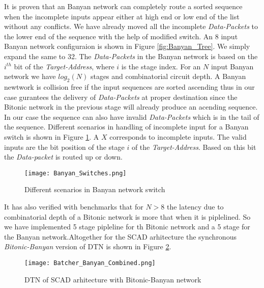 					      It is proven \cite{batcher_banyan_ref} that 
					      an Banyan network can completely route a sorted sequence when the incomplete inputs appear either at high end or low end of the list without any conflicts. We have already moved all the incomplete \textit{Data-Packets}
					      to the lower end of the sequence with the help of modified switch. An 8 input Banyan network configuraion is shown in Figure \ref{fig:Banyan_Tree}. We simply expand the same to 32.
					      The \textit{Data-Packets} in the Banyan network is based on the $i^{th}$ bit of the \textit{Target-Address}, where $i$ is the stage index. For an $N$ input Banyan network we have $log_{2}(N)$ 
					      stages and combinatorial circuit depth. A Banyan newtwork is collision free if the input sequences are sorted ascending
					      thus in our case gurantees the delivery of \textit{Data-Packets} at proper destination since the Bitonic network in the previous stage will already produce an acending sequence. In our case 
					      the sequence can also have invalid \textit{Data-Packets} which is in the tail of the sequence. Different scenarios in handling of incomplete input for a Banyan switch is shown in Figure \ref{fig:Banyan_Switches}.
					      A $X$ corresponds to incomplete inputs. The valid inputs are the bit position of the stage $i$ of the \textit{Target-Address}. Based on this bit the \textit{Data-packet} is routed up or down.
					      \begin{figure}[!ht]
						      \texttt{[image: Banyan\_Switches.png]}
						      \caption{Different scenarios in Banyan network switch }
					      \label{fig:Banyan_Switches}
					      \end{figure}
					      It has also verified with benchmarks \cite{sorting_network_on_fpgas} that for $N > 8$ the latency due to combinatorial depth of a Bitonic network is more that when it is piplelined. So we have implemented 5 stage pipleline 
					      for th Bitonic network and a 5 stage for the Banyan network.Altogether for the SCAD arhitecture the synchronous \textit{Bitonic-Banyan} version of DTN is shown in Figure \ref{fig:Batcher_Banyan_Combined}.
					      \begin{figure}[!ht]
						      \texttt{[image: Batcher\_Banyan\_Combined.png]}
						      \caption{DTN of SCAD arhitecture with Bitonic-Banyan network}
					      \label{fig:Batcher_Banyan_Combined}
					      \end{figure}

